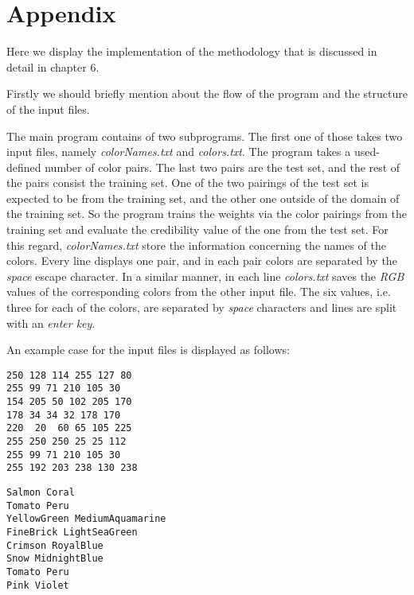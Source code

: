 \documentclass[egilmezThesis.tex]{subfiles}
\begin{document}
\newpage
\setcounter{page}{90}

\chapter*{\centering Appendix}
\label{chap:Appendix}

Here we display the implementation of the methodology that is discussed in detail in chapter 6.%

Firstly we should briefly mention about the flow of the program and the structure of the input files.

The main program contains of two subprograms. The first one of those takes two input files, namely \textit{colorNames.txt} and \textit{colors.txt}.  The program takes a used-defined number of color pairs. The last two pairs are the test set, and the rest of the pairs consist the training set. One of the two pairings of the test set is expected to be from the training set, and the other one outside of the domain of the training set. So the program trains the weights via the color pairings from the training set and evaluate the credibility value of the one from the test set. For this regard, \textit{colorNames.txt} store the information concerning the names of the colors. Every line displays one pair, and in each pair colors are separated by the \textit{space} escape character. In a similar manner, in each line \textit{colors.txt} saves the \textit{RGB} values of the corresponding colors from the other input file. The six values, i.e. three for each of the colors, are separated by \textit{space} characters and lines are split with an \textit{enter key}.

An example case for the input files is displayed as follows:
\newline
\newline
\lstset{language=C++,basicstyle=\footnotesize}
\begin{lstlisting}[caption=colors.txt, breaklines=true]
250 128 114 255 127 80
255 99 71 210 105 30
154 205 50 102 205 170
178 34 34 32 178 170
220  20  60 65 105 225
255 250 250 25 25 112
255 99 71 210 105 30
255 192 203 238 130 238
\end{lstlisting}

\newpage
\lstset{language=C++,basicstyle=\footnotesize}
\begin{lstlisting}[caption=colorNames.txt, breaklines=true]
Salmon Coral
Tomato Peru
YellowGreen MediumAquamarine	
FineBrick LightSeaGreen
Crimson RoyalBlue
Snow MidnightBlue
Tomato Peru
Pink Violet
\end{lstlisting}
\end{document}
